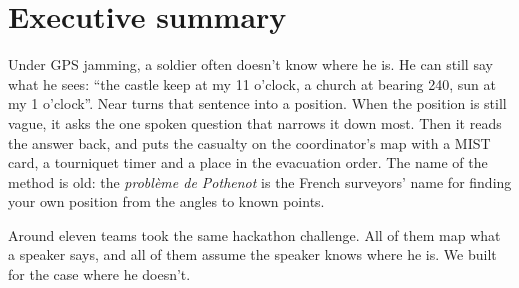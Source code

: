\chapter*{Executive summary}

Under GPS jamming, a soldier often doesn't know where he is. He can still say what he sees:
``the castle keep at my 11 o'clock, a church at bearing 240, sun at my 1 o'clock''. Near turns
that sentence into a position. When the position is still vague, it asks the one spoken question
that narrows it down most. Then it reads the answer back, and puts the casualty on the
coordinator's map with a MIST card, a tourniquet timer and a place in the evacuation order.
The name of the method is old: the \emph{problème de Pothenot} is the French surveyors' name for
finding your own position from the angles to known points.

Around eleven teams took the same hackathon challenge. All of them map what a speaker says, and
all of them assume the speaker knows where he is. We built for the case where he doesn't.

